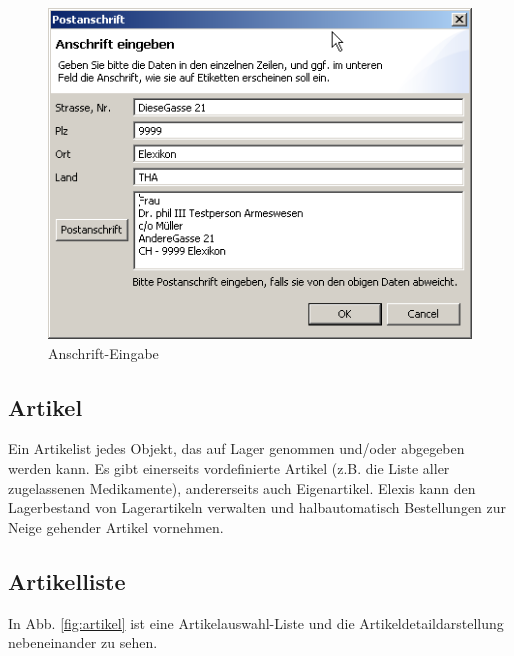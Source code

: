 \begin{figure}[htp]
\begin{center}
  \includegraphics{images/anschrifteingabe}
  \caption{Anschrift-Eingabe}
  \label{fig:anschrift}
\end{center}
\end{figure}
\bigskip
\pagebreak[3]
\subsection{Artikel}
\label{view:artikel}
Ein \glqq Artikel\grqq{}ist jedes Objekt, das auf Lager genommen und/oder
abgegeben werden kann. Es gibt einerseits vordefinierte Artikel (z.B. die Liste
aller zugelassenen Medikamente), andererseits auch Eigenartikel. Elexis kann den
Lagerbestand von Lagerartikeln verwalten und halbautomatisch Bestellungen zur Neige
gehender Artikel vornehmen.


\subsection{Artikelliste}
In Abb. \ref{fig:artikel} ist eine Artikelauswahl-Liste und die
Artikeldetaildarstellung nebeneinander zu sehen.

